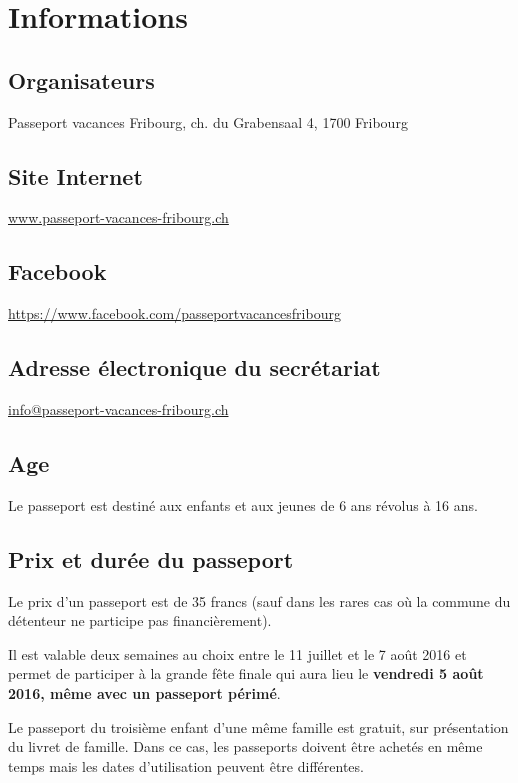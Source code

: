 \chapter{Informations}

\section*{Organisateurs}

Passeport vacances Fribourg, ch. du Grabensaal 4, 1700 Fribourg

\section*{Site Internet}

\url{www.passeport-vacances-fribourg.ch}

\section*{Facebook}

\url{https://www.facebook.com/passeportvacancesfribourg}

\section*{Adresse électronique du secrétariat}

\url{info@passeport-vacances-fribourg.ch}

\section*{Age}

Le passeport est destiné aux enfants et aux jeunes de 6 ans révolus à 16 ans.

\section*{Prix et durée du passeport}

Le prix d'un passeport est de 35 francs (sauf dans les rares cas où la commune du détenteur ne participe pas financièrement). 

Il est valable deux semaines au choix entre le 11 juillet et le 7 août 2016 et permet de participer à la grande fête finale qui aura lieu le \textbf{vendredi 5 août 2016, même avec un passeport périmé}. 

Le passeport du troisième enfant d'une même famille est gratuit, sur présentation du livret de famille. Dans ce cas, les passeports doivent être achetés en même temps mais les dates d'utilisation peuvent être différentes. 

